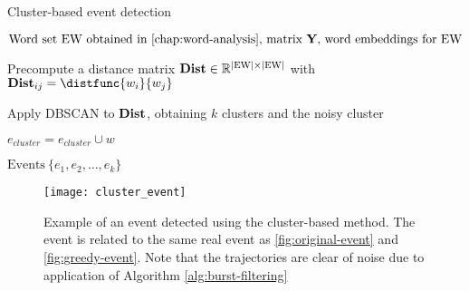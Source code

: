 \begin{algorithm}[H]
\begin{algorithmic}[1]
\caption{Cluster-based event detection}
\Input $\text{Word set EW obtained in \autoref{chap:word-analysis}, matrix } \trajmat \text{, word embeddings for EW}$

\State Precompute a distance matrix $\mathbf{Dist} \in \mathbb{R}^{\left\vert \text{EW} \right\vert \times \left\vert \text{EW} \right\vert}$ with $\distmat_{ij} = \distfunc{w_{i}}{w_{j}}$

\State Apply DBSCAN to $\mathbf{Dist}$, obtaining $k$ clusters and the noisy cluster

		\State $e_{cluster} = e_{cluster} \cup w$
	\EndIf
\EndFor

\Output $\text{Events} ~ \{ e_{1}, e_{2}, \dots, e_{k} \}$
\end{algorithmic}
\end{algorithm}


\begin{figure}[H]
  \centering
  \texttt{[image: cluster\_event]}  %
  \caption{Example of an event detected using the cluster-based method. The event is related to the same real event as \autoref{fig:original-event} and \autoref{fig:greedy-event}. Note that the trajectories are clear of noise due to application of Algorithm \ref{alg:burst-filtering}}
  \label{fig:cluster-event}
\end{figure}
